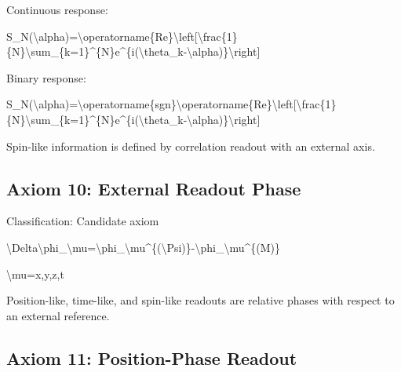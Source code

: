 \documentclass[
  a4paper]{article}
\newenvironment{Shaded}{}{}
\newcommand{\NormalTok}[1]{#1}
\begin{document}
Continuous response:

\begin{Shaded}
\begin{Highlighting}[]
\NormalTok{S\_N(\textbackslash{}alpha)=\textbackslash{}operatorname\{Re\}\textbackslash{}left[\textbackslash{}frac\{1\}\{N\}\textbackslash{}sum\_\{k=1\}\^{}\{N\}e\^{}\{i(\textbackslash{}theta\_k{-}\textbackslash{}alpha)\}\textbackslash{}right]}
\end{Highlighting}
\end{Shaded}

Binary response:

\begin{Shaded}
\begin{Highlighting}[]
\NormalTok{S\_N(\textbackslash{}alpha)=\textbackslash{}operatorname\{sgn\}\textbackslash{}operatorname\{Re\}\textbackslash{}left[\textbackslash{}frac\{1\}\{N\}\textbackslash{}sum\_\{k=1\}\^{}\{N\}e\^{}\{i(\textbackslash{}theta\_k{-}\textbackslash{}alpha)\}\textbackslash{}right]}
\end{Highlighting}
\end{Shaded}

Spin-like information is defined by correlation readout with an external
axis.

\subsection{Axiom 10: External Readout
Phase}\label{axiom-10-external-readout-phase}

Classification: Candidate axiom

\begin{Shaded}
\begin{Highlighting}[]
\NormalTok{\textbackslash{}Delta\textbackslash{}phi\_\textbackslash{}mu=\textbackslash{}phi\_\textbackslash{}mu\^{}\{(\textbackslash{}Psi)\}{-}\textbackslash{}phi\_\textbackslash{}mu\^{}\{(M)\}}
\end{Highlighting}
\end{Shaded}

\begin{Shaded}
\begin{Highlighting}[]
\NormalTok{\textbackslash{}mu=x,y,z,t}
\end{Highlighting}
\end{Shaded}

Position-like, time-like, and spin-like readouts are relative phases
with respect to an external reference.

\subsection{Axiom 11: Position-Phase
Readout}\label{axiom-11-position-phase-readout}
\end{document}
